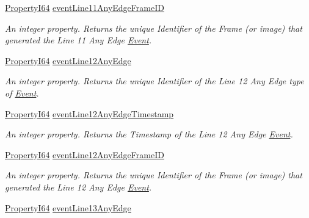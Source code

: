 \begin{DoxyCompactItemize}
\hyperlink{group___common_interface_ga81749b2696755513663492664a18a893}{Property\+I64} \hyperlink{classmv_i_m_p_a_c_t_1_1acquire_1_1_gen_i_cam_1_1_event_control_a9fc24a1d2d00429985a5513c88ad0441}{event\+Line11\+Any\+Edge\+Frame\+I\+D}
\begin{DoxyCompactList}\small\item\em An integer property. Returns the unique Identifier of the Frame (or image) that generated the Line 11 Any Edge \hyperlink{classmv_i_m_p_a_c_t_1_1acquire_1_1_event}{Event}. \end{DoxyCompactList}\item 
\hyperlink{group___common_interface_ga81749b2696755513663492664a18a893}{Property\+I64} \hyperlink{classmv_i_m_p_a_c_t_1_1acquire_1_1_gen_i_cam_1_1_event_control_a76b45cd200b68eef1bdc77586b303ea7}{event\+Line12\+Any\+Edge}
\begin{DoxyCompactList}\small\item\em An integer property. Returns the unique Identifier of the Line 12 Any Edge type of \hyperlink{classmv_i_m_p_a_c_t_1_1acquire_1_1_event}{Event}. \end{DoxyCompactList}\item 
\hyperlink{group___common_interface_ga81749b2696755513663492664a18a893}{Property\+I64} \hyperlink{classmv_i_m_p_a_c_t_1_1acquire_1_1_gen_i_cam_1_1_event_control_adcb017795129dacda692baf3d95e7b63}{event\+Line12\+Any\+Edge\+Timestamp}
\begin{DoxyCompactList}\small\item\em An integer property. Returns the Timestamp of the Line 12 Any Edge \hyperlink{classmv_i_m_p_a_c_t_1_1acquire_1_1_event}{Event}. \end{DoxyCompactList}\item 
\hyperlink{group___common_interface_ga81749b2696755513663492664a18a893}{Property\+I64} \hyperlink{classmv_i_m_p_a_c_t_1_1acquire_1_1_gen_i_cam_1_1_event_control_a26f5d0d0e86a8b06734ff3dec1b1bbd8}{event\+Line12\+Any\+Edge\+Frame\+I\+D}
\begin{DoxyCompactList}\small\item\em An integer property. Returns the unique Identifier of the Frame (or image) that generated the Line 12 Any Edge \hyperlink{classmv_i_m_p_a_c_t_1_1acquire_1_1_event}{Event}. \end{DoxyCompactList}\item 
\hyperlink{group___common_interface_ga81749b2696755513663492664a18a893}{Property\+I64} \hyperlink{classmv_i_m_p_a_c_t_1_1acquire_1_1_gen_i_cam_1_1_event_control_ae89a07545f5875608952afd69c3e1ed4}{event\+Line13\+Any\+Edge}

\end{DoxyCompactItemize}
